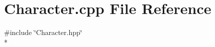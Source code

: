 \section{Character.\-cpp File Reference}
\label{_character_8cpp}
{\ttfamily \#include \char`\"{}Character.\-hpp\char`\"{}}\\*
